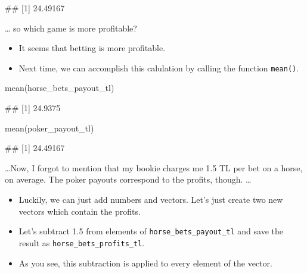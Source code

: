 \documentclass[
]{book}
\newenvironment{Shaded}{\begin{snugshade}}{\end{snugshade}}
\newcommand{\FunctionTok}[1]{\textcolor[rgb]{0.00,0.00,0.00}{#1}}
\newcommand{\NormalTok}[1]{#1}
\begin{document}
\begin{Shaded}
\begin{Highlighting}[]
\NormalTok{\#\# [1] 24.49167}
\end{Highlighting}
\end{Shaded}

\ldots{} so which game is more profitable?

\begin{itemize}
\item
  It seems that betting is more profitable.
\item
  Next time, we can accomplish this calulation by calling the function \texttt{mean()}.
\end{itemize}

\begin{Shaded}
\begin{Highlighting}[]
\FunctionTok{mean}\NormalTok{(horse\_bets\_payout\_tl)}
\end{Highlighting}
\end{Shaded}

\begin{Shaded}
\begin{Highlighting}[]
\NormalTok{\#\# [1] 24.9375}
\end{Highlighting}
\end{Shaded}

\begin{Shaded}
\begin{Highlighting}[]
\FunctionTok{mean}\NormalTok{(poker\_payout\_tl)}
\end{Highlighting}
\end{Shaded}

\begin{Shaded}
\begin{Highlighting}[]
\NormalTok{\#\# [1] 24.49167}
\end{Highlighting}
\end{Shaded}

\ldots Now, I forgot to mention that my bookie charges me 1.5 TL per bet on a horse, on average. The poker payouts correspond to the profits, though. \ldots 

\begin{itemize}
\item
  Luckily, we can just add numbers and vectors. Let's just create two new vectors which contain the profits.
\item
  Let's subtract 1.5 from elements of \texttt{horse\_bets\_payout\_tl} and save the result as \texttt{horse\_bets\_profits\_tl}.
\item
  As you see, this subtraction is applied to every element of the vector.
\end{itemize}
\end{document}
